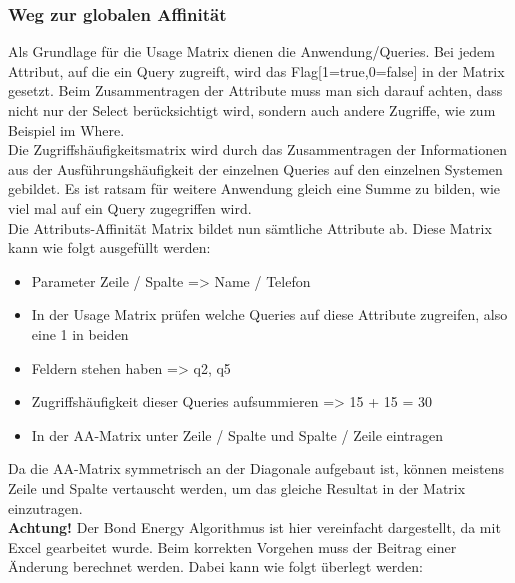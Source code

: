 \documentclass[a4paper,10pt,titlepage=false]{scrreprt}
\begin{document}
\subsubsection{Weg zur globalen Affinität}
Als Grundlage für die Usage Matrix dienen die Anwendung/Queries. Bei jedem Attribut, auf die ein Query zugreift, wird das Flag[1=true,0=false] in der Matrix gesetzt. Beim Zusammentragen der Attribute muss man sich darauf achten, dass nicht nur der Select berücksichtigt wird, sondern auch andere Zugriffe, wie zum Beispiel im Where.\\
Die Zugriffshäufigkeitsmatrix wird durch das Zusammentragen der Informationen aus der Ausführungshäufigkeit der einzelnen Queries auf den einzelnen Systemen gebildet. Es ist ratsam für weitere Anwendung gleich eine Summe zu bilden, wie viel mal auf ein Query zugegriffen wird.\\
Die Attributs-Affinität Matrix bildet nun sämtliche Attribute ab. Diese Matrix kann wie folgt ausgefüllt werden:
\begin{itemize}
\item Parameter Zeile / Spalte => Name / Telefon
\item In der Usage Matrix prüfen welche Queries auf diese Attribute zugreifen, also eine 1 in beiden \item Feldern stehen haben => q2, q5
\item Zugriffshäufigkeit dieser Queries aufsummieren => 15 + 15 = 30
\item In der AA-Matrix unter Zeile / Spalte und Spalte / Zeile eintragen
\end{itemize}
Da die AA-Matrix symmetrisch an der Diagonale aufgebaut ist, können meistens Zeile und Spalte vertauscht werden, um das gleiche Resultat in der Matrix einzutragen.\\
\textbf{Achtung!} Der Bond Energy Algorithmus ist hier vereinfacht dargestellt, da mit Excel gearbeitet wurde. Beim korrekten Vorgehen muss der Beitrag einer Änderung berechnet werden. Dabei kann wie folgt überlegt werden:
\end{document}
